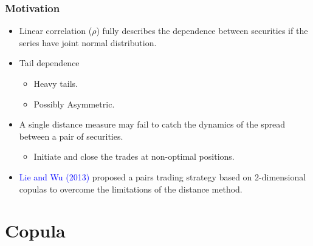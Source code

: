 \documentclass[pdf,9pt,xcolor=dvipsnames,hide notes]{beamer}
\begin{document}
	
	\begin{frame}[label=frame1c]
		\frametitle{Motivation}
		
		
		\begin{itemize}
			\justifying
			
			\item Linear correlation ($\rho$) fully describes the dependence between securities if the series have joint normal distribution. 
			
			\pause
			
			\vspace{0.3cm}
			
			\item  Tail dependence
				\begin{itemize}
					\item Heavy tails.
					\item Possibly Asymmetric.
				\end{itemize}
			
			
	\vspace{0.3cm}
	
	\pause
			
		\item A single distance measure may fail to catch the dynamics of the spread between a pair of securities.
		
	\pause
		\begin{itemize}
			\item Initiate and close the trades at non-optimal positions.
		\end{itemize}

	\pause	
			\vspace{0.3cm}
			
			\item \textcolor{blue}{Lie and Wu} \textcolor{blue}{(2013)} proposed a pairs trading strategy based on 2-dimensional copulas to overcome the limitations of the distance method.
			
			\vspace{0.3cm}
			
		
		\end{itemize}
	\end{frame}

\section{Copula}
	
\end{document}
